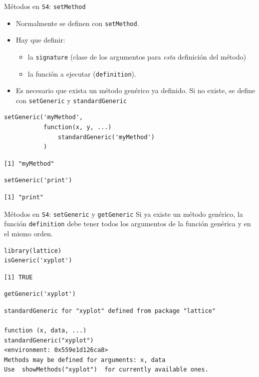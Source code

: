 \documentclass[xcolor={usenames,svgnames,dvipsnames}]{beamer}
\begin{document}
\begin{frame}[fragile,label={sec:org1d1d045}]{Métodos en \texttt{S4}: \texttt{setMethod}}
 \begin{itemize}
\item Normalmente se definen con \texttt{setMethod}.
\item Hay que definir:
\begin{itemize}
\item la \texttt{signature} (clase de los argumentos para \emph{esta} definición del
método)
\item la función a ejecutar (\texttt{definition}).
\end{itemize}
\item Es necesario que exista un método genérico ya definido. Si no
existe, se define con \texttt{setGeneric} y \texttt{standardGeneric}
\end{itemize}
\lstset{language=r,label= ,caption= ,captionpos=b,numbers=none}
\begin{lstlisting}
setGeneric('myMethod',
           function(x, y, ...)
               standardGeneric('myMethod')
           )
\end{lstlisting}

\begin{verbatim}
[1] "myMethod"
\end{verbatim}

\lstset{language=r,label= ,caption= ,captionpos=b,numbers=none}
\begin{lstlisting}
setGeneric('print')
\end{lstlisting}

\begin{verbatim}
[1] "print"
\end{verbatim}
\end{frame}

\begin{frame}[fragile,label={sec:org86eab04}]{Métodos en \texttt{S4}: \texttt{setGeneric} y \texttt{getGeneric}}
 Si ya existe un método genérico, la función \texttt{definition} debe tener
todos los argumentos de la función genérica y en el mismo orden.

\lstset{language=r,label= ,caption= ,captionpos=b,numbers=none}
\begin{lstlisting}
library(lattice)  
isGeneric('xyplot')
\end{lstlisting}

\begin{verbatim}
[1] TRUE
\end{verbatim}

\lstset{language=r,label= ,caption= ,captionpos=b,numbers=none}
\begin{lstlisting}
getGeneric('xyplot')
\end{lstlisting}

\begin{verbatim}
standardGeneric for "xyplot" defined from package "lattice"

function (x, data, ...) 
standardGeneric("xyplot")
<environment: 0x559e1d126ca8>
Methods may be defined for arguments: x, data
Use  showMethods("xyplot")  for currently available ones.
\end{verbatim}
\end{frame}
\end{document}
